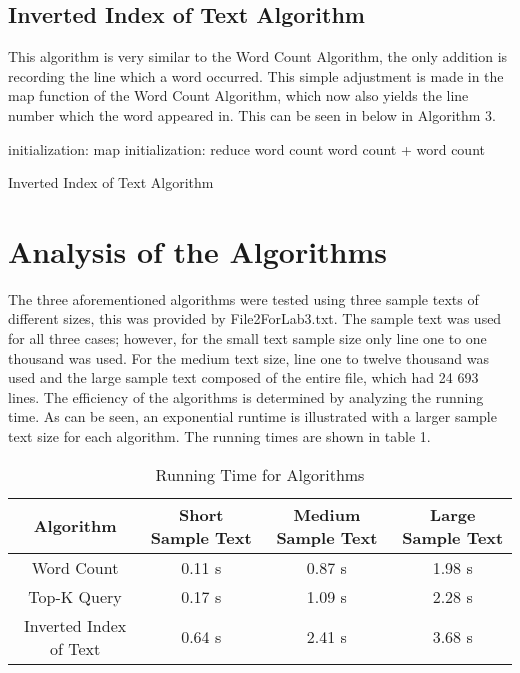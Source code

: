 \documentclass[twocolumn, 11pt]{IEEEtran}
\begin{document}
\subsection{Inverted Index of Text Algorithm}

This algorithm is very similar to the Word Count Algorithm, the only addition is recording the line which a word occurred. This simple adjustment is made in the map function of the Word Count Algorithm, which now also yields the line number which the word appeared in. This can be seen in below in Algorithm 3.

\begin{algorithm}
\SetAlgoLined
     initialization: map\;
     initialization: reduce\;
     word count \leftarrow word count + word count\; 
     \caption{Inverted Index of Text Algorithm}
\end{algorithm}

\section{Analysis of the Algorithms}

The three aforementioned algorithms were tested using three sample texts of different sizes, this was provided by File2ForLab3.txt. The sample text was used for all three cases; however, for the small text sample size only line one to one thousand was used. For the medium text size, line one to twelve thousand was used and the large sample text composed of the entire file, which had 24 693 lines. The efficiency of the algorithms is determined by analyzing the running time. As can be seen, an  exponential runtime is illustrated with a larger sample text size for each algorithm. The running times are shown in table 1.

\begin{table}[H]
\caption{Running Time for Algorithms}
\label{table_example}
\begin{center}
\begin{tabular}{|c|c|c|c|}
\hline
Algorithm & Short Sample Text & Medium Sample Text & Large Sample Text  \\
\hline

\hline
 Word Count &  0.11 s  &  0.87 s   &  1.98 s   \\
\hline
  Top-K Query & 0.17 s  &  1.09 s  &   2.28 s \\
\hline
 Inverted Index of Text &  0.64 s  &  2.41 s  &   3.68 s \\
\hline

\end{tabular}
\end{center}
\end{table}
\end{document}
